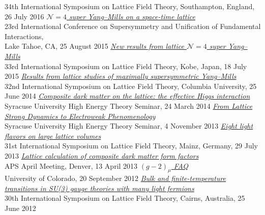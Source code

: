 \begin{spacelist}
\begin{revnumerate}
      34th International Symposium on Lattice Field Theory, Southampton, England, 26 July 2016
    \pagebreakitem
      \textit{\href{http://www.davidschaich.net/talks/SUSY15.pdf}{$\mathcal N = 4$ super Yang--Mills on a space-time lattice}} \\
      23rd International Conference on Supersymmetry and Unification of Fundamental Interactions, \\ Lake Tahoe, CA, 25 August 2015
    \pagebreakitem
      \textit{\href{http://www.davidschaich.net/talks/lattice15.pdf}{New results from lattice $\mathcal N = 4$ super Yang--Mills}} \\
      33rd International Symposium on Lattice Field Theory, Kobe, Japan, 18 July 2015
    \pagebreakitem
      \textit{\href{http://www.davidschaich.net/talks/lattice14.pdf}{Results from lattice studies of maximally supersymmetric Yang--Mills}} \\
      32nd International Symposium on Lattice Field Theory, Columbia University, 25 June 2014
    \pagebreakitem
      \textit{\href{http://www.davidschaich.net/talks/LSD_SU4_1403.pdf}{Composite dark matter on the lattice: the effective Higgs interaction}} \\
      Syracuse University High Energy Theory Seminar, 24 March 2014
    \pagebreakitem
      \textit{\href{http://www.davidschaich.net/talks/LSD_EFT13.pdf}{From Lattice Strong Dynamics to Electroweak Phenomenology}} \\
      Syracuse University High Energy Theory Seminar, 4 November 2013
    \pagebreakitem
      \textit{\href{http://www.davidschaich.net/talks/lattice13.pdf}{Eight light flavors on large lattice volumes}} \\
      31st International Symposium on Lattice Field Theory, Mainz, Germany, 29 July 2013
    \pagebreakitem
      \textit{\href{http://www.davidschaich.net/talks/April13.pdf}{Lattice calculation of composite dark matter form factors}} \\
      APS April Meeting, Denver, 13 April 2013
    \pagebreakitem
      \textit{\href{http://www.davidschaich.net/talks/g-2_1209.pdf}{$(g - 2)_{\mu}$ FAQ}} \\
      University of Colorado, 20 September 2012
    \pagebreakitem
      \textit{\href{http://www.davidschaich.net/talks/lattice12.pdf}{Bulk and finite-temperature transitions in SU(3) gauge theories with many light fermions}} \\
      30th International Symposium on Lattice Field Theory, Cairns, Australia, 25 June 2012
    \pagebreakitem

\end{revnumerate}
\end{spacelist}
